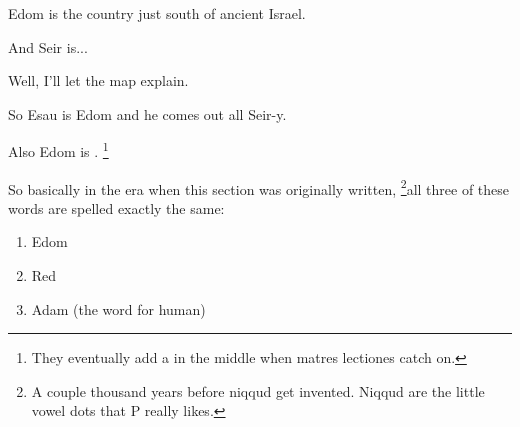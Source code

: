 {{	Edom is the country just south of ancient Israel.

	And Seir is...

	Well, I'll let the map explain.

	\par\nopagebreak[4]
	\begin{center}
	\end{center}

	So Esau is Edom and he comes out all Seir-y.

	Also Edom is .%
	\footnote{They eventually add a  in the middle when matres lectiones catch on.}

	So basically in the era when this section was originally written,%
	\footnote{
		A couple thousand years before niqqud get invented.
		Niqqud are the little vowel dots that P really likes.
	}all three of these words are spelled exactly the same:

	\begin{enumerate}
	\item Edom
	\item Red
	\item Adam (the word for human)
	\end{enumerate}
	}
}


